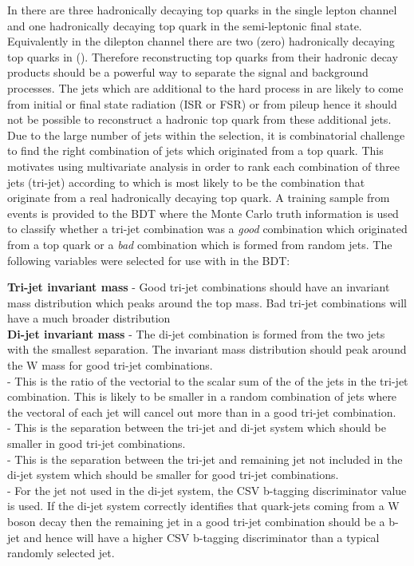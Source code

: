 In \tttt there are three hadronically decaying top quarks in the single lepton channel and one hadronically decaying top quark in the semi-leptonic \ttbar final state. Equivalently in the dilepton channel there are two (zero) hadronically decaying top quarks in \tttt (\ttbar). Therefore reconstructing top quarks from their hadronic decay products should be a powerful way to separate the signal and background processes. The jets which are additional to the hard process in \ttbar are likely to come from initial or final state radiation (ISR or FSR) or from pileup hence it should not be possible to reconstruct a hadronic top quark from these additional jets. Due to the large number of jets within the selection, it is combinatorial challenge to find the right combination of jets which originated from a top quark. This motivates using multivariate analysis in order to rank each combination of three jets (tri-jet) according to which is most likely to be the combination that originate from a real hadronically decaying top quark.
A training sample from \ttbar events is provided to the BDT where the Monte Carlo truth information is used to classify whether a tri-jet combination was a \emph{good} combination which originated from a top quark or a \emph{bad} combination which is formed from random jets. The following variables were selected for use with in the BDT:

\textbf{Tri-jet invariant mass} - Good tri-jet combinations should have an invariant mass distribution which peaks around the top mass.
Bad tri-jet combinations will have a much broader distribution \\
\textbf{Di-jet invariant mass} - The di-jet combination is formed from the two jets with the smallest \DR separation. The invariant mass distribution should peak around the W mass for good tri-jet combinations.\\
\textbf{\ptrat} - This is the ratio of the vectorial \pt to the scalar sum of the \pt of the jets in the tri-jet combination. This is likely to be smaller in a random combination of jets where the vectoral \pt of each jet will cancel out more than in a good tri-jet combination.\\
\textbf{\DPTW} - This is the \Dphi separation between the tri-jet and di-jet system which should be smaller in good tri-jet combinations.\\
\textbf{\DPTb} - This is the \Dphi separation between the tri-jet and remaining jet not included in the di-jet system which should be smaller for good tri-jet combinations.\\
\textbf{\CSVj} - For the jet not used in the di-jet system, the CSV b-tagging discriminator value is used. If the di-jet system correctly identifies that quark-jets coming from a W boson decay then the remaining jet in a good tri-jet combination should be a b-jet and hence will have a higher CSV b-tagging discriminator than a typical randomly selected jet.\\

